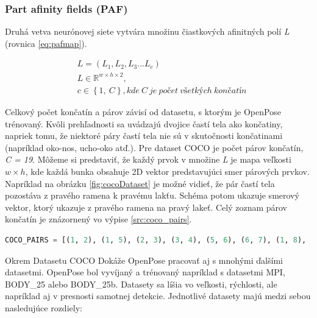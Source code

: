 \documentclass[slovak,master,dept460,male,cpp,cpdeclaration]{diploma}
\begin{document}
\subsubsection{Part afinity fields (PAF)}
Druhá vetva neurónovej siete vytvára množinu čiastkových afinitných polí \textit{L} (rovnica \ref{eq:pafmap}).

\begin{eqnarray}
& L = (L_{1}, L_{2}, L_{3} ... L_{c}) \label{eq:pafmap}\\
& L\in\mathbb{R}^{w \times  h \times 2},\nonumber\\
& c\in \left \{1,\: C  \right \}, kde\: C\: je\: počet\: všetkých\: končatín\nonumber
\end{eqnarray}

Celkový počet končatín a párov závisí od datasetu, s ktorým je OpenPose trénovaný. Kvôli prehľadnosti sa uvádzajú dvojice častí tela ako končatiny, napriek tomu, že niektoré páry častí tela nie sú v skutočnosti končatinami (napríklad oko-nos, ucho-oko atď.). Pre dataset COCO je počet párov končatín, \textit{C = 19}. Môžeme si predstaviť, že každý prvok v množine \textit{L} je mapa veľkosti \textit{$w\times h$}, kde každá bunka obsahuje 2D vektor predstavujúci smer párových prvkov. Napríklad na obrázku \ref{fig:cocoDataset} je možné vidieť, že pár častí tela pozostáva z pravého ramena k pravému lakťu. Schéma potom ukazuje smerový vektor, ktorý ukazuje z pravého ramena na pravý lakeť. Celý zoznam párov končatín je znázornený vo výpise \ref{src:coco_pairs}.\bigskip

\begin{lstlisting}[language=Python,label=src:coco_pairs,caption={Množina párov končatín v datasete COCO}]
COCO_PAIRS = [(1, 2), (1, 5), (2, 3), (3, 4), (5, 6), (6, 7), (1, 8), (8, 9), (9, 10), (1, 11), (11, 12), (12, 13), (1, 0), (0, 14), (14, 16), (0, 15), (15, 17), (2, 16), (5, 17)]
\end{lstlisting}

\bigskip
Okrem Datasetu COCO Dokáže OpenPose pracovať aj s mnohými ďalšími datasetmi. OpenPose bol vyvíjaný a trénovaný napríklad s datasetmi MPI\cite{andriluka14cvpr}, BODY\_25 alebo BODY\_25b. Datasety sa líšia vo veľkosti, rýchlosti, ale napríklad  aj v presnosti samotnej detekcie. Jednotlivé datasety majú medzi sebou nasledujúce rozdiely:
\end{document}
